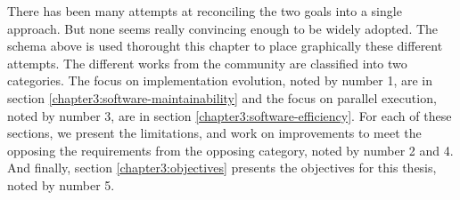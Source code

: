 There has been many attempts at reconciling the two goals into a single approach.
But none seems really convincing enough to be widely adopted.
The schema above is used thorought this chapter to place graphically these different attempts.
The different works from the community are classified into two categories.
The focus on implementation evolution, noted by number 1, are in section \ref{chapter3:software-maintainability} and the focus on parallel execution, noted by number 3, are in section \ref{chapter3:software-efficiency}.
For each of these sections, we present the limitations, and work on improvements to meet the opposing the requirements from the opposing category, noted by number 2 and 4.
And finally, section \ref{chapter3:objectives} presents the objectives for this thesis, noted by number 5.







                                    \endinput


\section{Introduction}

In this section I analyze the current solutions to provide concurrency for web servers.
The criterion for this analysis are :

\begin{itemize}
\item how the solution (language) exposes the memory to the developer.
\item how the solution (language) exposes the invariance on this memory. These two language choices should be representative of the ease for a developer to develop with this language.
\item how the solution (infrastructure) finally extract parallelism based on the memory and its invariance (annotations or not, and how well ).
\item The expected ratio of parallelism over the total execution. and the ratio of communcation over the total state. These two ratios should be representative of the expected speedup in function of the resources made available.
\end{itemize}

